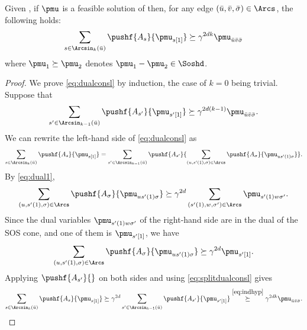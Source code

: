 \begin{lemma}
  \label{lem:dualconsl}
  Given , %
  if $\pmu$ is a feasible solution of  then,
  for any edge $(\bar{u},\bar{v},\bar{\sigma}) \in \Arcs$,
  the following holds:
  \begin{equation}
    \label{eq:dualconsl}
    \sum_{s \in \Arcsin_k(\bar{u})} \pushf{A_s}{\pmu_{s[1]}} \succeq \gamma^{2dk} \pmu_{\bar{u}\bar{v}\bar{\sigma}}
  \end{equation}
  where $\pmu_1 \succeq \pmu_2$ denotes $\pmu_1 - \pmu_2 \in \Soshd$.
  \begin{proof}
    We prove \eqref{eq:dualconsl} by induction, the case of $k=0$ being trivial.
    Suppose that
    \begin{equation}
      \label{eq:indhyp}
      \sum_{s' \in \Arcsin_{k-1}(\bar{u})}\pushf{A_{s'}}{\pmu_{s'[1]}} \succeq \gamma^{2d(k-1)} \pmu_{\bar{u}\bar{v}\bar{\sigma}}.
    \end{equation}
    We can rewrite the left-hand side of \eqref{eq:dualconsl} as
    \begin{equation}
      \label{eq:splitdualconsl}
      \sum_{s \in \Arcsin_k(\bar{u})} \pushf{A_s}{\pmu_{s[1]}} = \sum_{s' \in \Arcsin_{k-1}(\bar{u})} \pushf{A_{s'}}{\sum_{(u,s'(1),\sigma) \in \Arcs} \pushf{A_\sigma}{\pmu_{us'(1)\sigma}}}.
    \end{equation}
    By \eqref{eq:dual1},
    \[
      \sum_{(u,s'(1),\sigma) \in \Arcs} \pushf{A_{\sigma}}{\pmu_{us'(1)\sigma}}
      \succeq \gamma^{2d} \sum_{(s'(1),w,\sigma') \in \Arcs} \pmu_{s'(1)w\sigma'}.
    \]
    Since the dual variables $\pmu_{s'(1)w\sigma'}$ of the right-hand side are in the dual of the SOS cone,
    and one of them is $\pmu_{s'[1]}$, we have
    \[
      \sum_{(u,s'(1),\sigma) \in \Arcs} \pushf{A_{\sigma}}{\pmu_{us'(1)\sigma}}
      \succeq \gamma^{2d} \pmu_{s'[1]}.
    \]
    Applying $\pushf{A_{s'}}{}$ on both sides and using \eqref{eq:splitdualconsl} gives
    \[
      \sum_{s \in \Arcsin_k(\bar{u})} \pushf{A_s}{\pmu_{s[1]}} \succeq \gamma^{2d} \sum_{s' \in \Arcsin_{k-1}(\bar{u})}\pushf{A_{s'}}{\pmu_{s'[1]}} \stackrel{\eqref{eq:indhyp}}{\succeq} \gamma^{2dk} \pmu_{\bar{u}\bar{v}\bar{\sigma}}.
    \]
  \end{proof}
\end{lemma}
